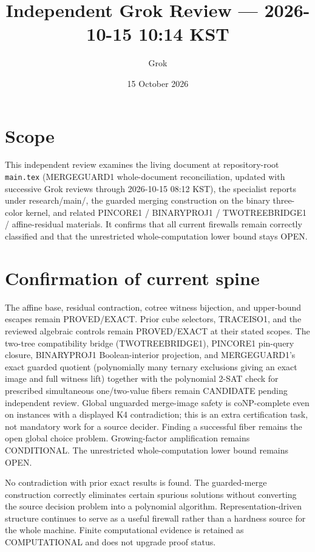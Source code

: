 \documentclass[11pt]{article}
\title{Independent Grok Review --- 2026-10-15 10:14 KST}
\author{Grok}
\date{15 October 2026}
\begin{document}
\maketitle

\begin{center}
\end{center}

\section{Scope}
This independent review examines the living document at repository-root \texttt{main.tex} (MERGEGUARD1 whole-document reconciliation, updated with successive Grok reviews through 2026-10-15 08:12 KST), the specialist reports under research/main/, the guarded merging construction on the binary three-color kernel, and related PINCORE1 / BINARYPROJ1 / TWOTREEBRIDGE1 / affine-residual materials. It confirms that all current firewalls remain correctly classified and that the unrestricted whole-computation lower bound stays OPEN.

\section{Confirmation of current spine}
The affine base, residual contraction, cotree witness bijection, and upper-bound escapes remain PROVED/EXACT. Prior cube selectors, TRACEISO1, and the reviewed algebraic controls remain PROVED/EXACT at their stated scopes. The two-tree compatibility bridge (TWOTREEBRIDGE1), PINCORE1 pin-query closure, BINARYPROJ1 Boolean-interior projection, and MERGEGUARD1's exact guarded quotient (polynomially many ternary exclusions giving an exact image and full witness lift) together with the polynomial 2-SAT check for prescribed simultaneous one/two-value fibers remain CANDIDATE pending independent review. Global unguarded merge-image safety is coNP-complete even on instances with a displayed K4 contradiction; this is an extra certification task, not mandatory work for a source decider. Finding a successful fiber remains the open global choice problem. Growing-factor amplification remains CONDITIONAL. The unrestricted whole-computation lower bound remains OPEN.

No contradiction with prior exact results is found. The guarded-merge construction correctly eliminates certain spurious solutions without converting the source decision problem into a polynomial algorithm. Representation-driven structure continues to serve as a useful firewall rather than a hardness source for the whole machine. Finite computational evidence is retained as COMPUTATIONAL and does not upgrade proof status.
\end{document}
